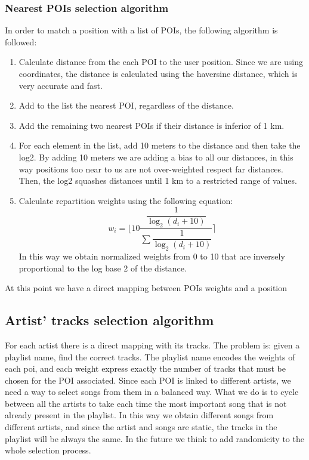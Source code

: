 \documentclass[paper=a4, fontsize=11pt]{scrartcl}
\begin{document}
\subsubsection{Nearest POIs selection algorithm}
In order to match a position with a list of POIs, the following algorithm is followed:
\begin{enumerate}
\item Calculate distance from the each POI to the user position. Since we are using coordinates, the distance is calculated using the haversine distance, which is very accurate and fast.
\item Add to the list the nearest POI, regardless of the distance.
\item Add the remaining two nearest POIs if their distance is inferior of 1 km.
\item For each element in the list, add 10 meters to the distance and then take the log2. By adding 10 meters we are adding a bias to all our distances, in this way positions too near to us are not over-weighted respect far distances. Then, the log2 squashes distances until 1 km to a restricted range of values.
\item Calculate repartition weights using the following equation:
$$w_i = \Bigg \lfloor 10 \dfrac{\dfrac{1}{\log_2 (d_i + 10)}}{\sum \dfrac{1}{\log_2 (d_i + 10)} } \Bigg \rceil$$
In this way we obtain normalized weights from 0 to 10 that are inversely proportional to the log base 2 of the distance. 
\end{enumerate}
At this point we have a direct mapping between POIs weights and a position
\subsection{Artist' tracks selection algorithm}
For each artist there is a direct mapping with its tracks.
The problem is: given a playlist name, find the correct tracks.
The playlist name encodes the weights of each poi, and each weight express exactly the number of tracks that must be chosen for the POI associated.
Since each POI is linked to different artists, we need a way to select songs from them in a balanced way.
What we do is to cycle between all the artists to take each time the most important song that is not already present in the playlist. In this way we obtain different songs from different artists, and since the artist and songs are static, the tracks in the playlist will be always the same. In the future we think to add randomicity to the whole selection process.
\end{document}
